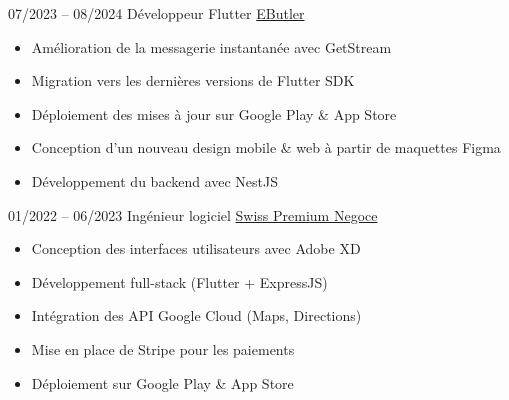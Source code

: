 \documentclass[9pt]{developercv} %
\begin{document}





\vspace{10 pt}
\begin{entrylist}
    \entry
    {07/2023 -- 08/2024}
    {Développeur Flutter}
    {\href{https://www.e-butler.com}{EButler}}
    {\vspace{-10pt}
        \begin{itemize}[noitemsep,topsep=0pt,parsep=0pt,partopsep=0pt, leftmargin=-1pt]
            \item Amélioration de la messagerie instantanée avec GetStream
            \item Migration vers les dernières versions de Flutter SDK
            \item Déploiement des mises à jour sur Google Play \& App Store
            \item Conception d'un nouveau design mobile \& web à partir de maquettes Figma
            \item Développement du backend avec NestJS
        \end{itemize}
        }
    \entry
    {01/2022 -- 06/2023}
    {Ingénieur logiciel}
    {\href{https://www.swisspremiumnegoce.com}{Swiss Premium Negoce}}
    {\vspace{-10pt}


        \begin{itemize}[noitemsep,topsep=0pt,parsep=0pt,partopsep=0pt, leftmargin=-1pt]
            \item Conception des interfaces utilisateurs avec Adobe XD
            \item Développement full-stack (Flutter + ExpressJS)
            \item Intégration des API Google Cloud (Maps, Directions)
            \item Mise en place de Stripe pour les paiements
            \item Déploiement sur Google Play \& App Store
        \end{itemize}
        }
\end{entrylist}
\end{document}
